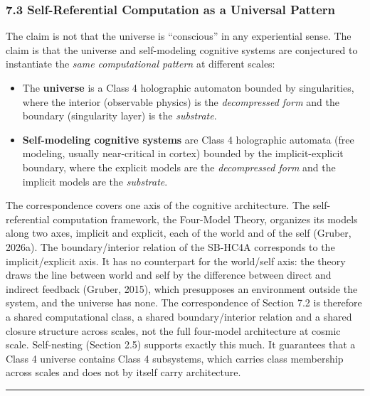 \documentclass[
]{article}
\begin{document}
\hypertarget{self-referential-computation-as-a-universal-pattern}{%
\subsubsection{7.3 Self-Referential Computation as a Universal
Pattern}\label{self-referential-computation-as-a-universal-pattern}}

The claim is not that the universe is ``conscious'' in any experiential
sense. The claim is that the universe and self-modeling cognitive
systems are conjectured to instantiate the \emph{same computational
pattern} at different scales:

\begin{itemize}
\item
  The \textbf{universe} is a Class 4 holographic automaton bounded by
  singularities, where the interior (observable physics) is the
  \emph{decompressed form} and the boundary (singularity layer) is the
  \emph{substrate}.
\item
  \textbf{Self-modeling cognitive systems} are Class 4 holographic
  automata (free modeling, usually near-critical in cortex) bounded by
  the implicit-explicit boundary, where the explicit models are the
  \emph{decompressed form} and the implicit models are the
  \emph{substrate}.
\end{itemize}

The correspondence covers one axis of the cognitive architecture. The
self-referential computation framework, the Four-Model Theory, organizes
its models along two axes, implicit and explicit, each of the world and
of the self (Gruber, 2026a). The boundary/interior relation of the
SB-HC4A corresponds to the implicit/explicit axis. It has no counterpart
for the world/self axis: the theory draws the line between world and
self by the difference between direct and indirect feedback (Gruber,
2015), which presupposes an environment outside the system, and the
universe has none. The correspondence of Section 7.2 is therefore a
shared computational class, a shared boundary/interior relation and a
shared closure structure across scales, not the full four-model
architecture at cosmic scale. Self-nesting (Section 2.5) supports
exactly this much. It guarantees that a Class 4 universe contains Class
4 subsystems, which carries class membership across scales and does not
by itself carry architecture.

\begin{center}\rule{0.5\linewidth}{0.5pt}\end{center}
\end{document}
